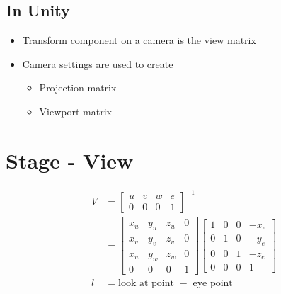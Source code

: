   \subsection{In Unity}

    \begin{itemize}
      \item Transform component on a camera is the view matrix
      \item Camera settings are used to create
      \begin{itemize}
        \item Projection matrix
        \item Viewport matrix
      \end{itemize}
    \end{itemize}

\section{Stage - View}

  \begin{align}
    V &=
    \begin{bmatrix}
      u & v & w & e \\
      0 & 0 & 0 & 1
    \end{bmatrix}^{-1} \\
    &=
    \begin{bmatrix}
      x_{u} & y_{u} & z_{u} & 0 \\
      x_{v} & y_{v} & z_{v} & 0 \\
      x_{w} & y_{w} & z_{w} & 0 \\
      0 & 0 & 0 & 1
    \end{bmatrix}
    \begin{bmatrix}
      1 & 0 & 0 & -x_{e} \\
      0 & 1 & 0 & -y_{e} \\
      0 & 0 & 1 & -z_{e} \\
      0 & 0 & 0 & 1
    \end{bmatrix} \\
    l &= \text{look at point } - \text{ eye point}
  \end{align}

